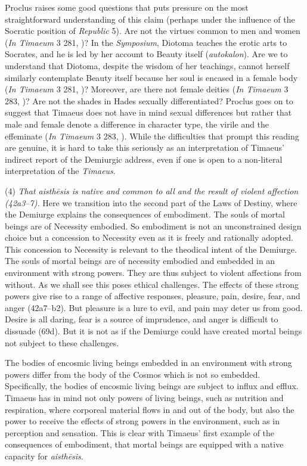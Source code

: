 Proclus raises some good questions that puts pressure on the most straightforward understanding of this claim (perhaps under the influence of the Socratic position of \emph{Republic} 5). Are not the virtues common to men and women (\emph{In Timaeum} 3 281, \citealt{Diehl:1903re})? In the \emph{Symposium}, Diotoma teaches the erotic arts to Socrates, and he is led by her account to Beauty itself (\emph{autokalon}). Are we to understand that Diotoma, despite the wisdom of her teachings, cannot herself similarly contemplate Beauty itself because her soul is encased in a female body (\emph{In Timaeum} 3 281, \citealt{Diehl:1903re})? Moreover, are there not female deities (\emph{In Timaeum} 3 283, \citealt{Diehl:1903re})? Are not the shades in Hades sexually differentiated? Proclus goes on to suggest that Timaeus does not have in mind sexual differences but rather that male and female denote a difference in character type, the virile and the effeminate (\emph{In Timaeum} 3 283, \citealt{Diehl:1903re}). While the difficulties that prompt this reading are genuine, it is hard to take this seriously as an interpretation of Timaeus' indirect report of the Demiurgic address, even if one is open to a non-literal interpretation of the \emph{Timaeus}.

(4) \emph{That \emph{aisthēsis} is native and common to all and the result of violent affection (42a3--7).} Here we transition into the second part of the Laws of Destiny, where the Demiurge explains the consequences of embodiment. The souls of mortal beings are of Necessity embodied. So embodiment is not an unconstrained design choice but a concession to Necessity even as it is freely and rationally adopted. This concession to Necessity is relevant to the theodical intent of the Demiurge. The souls of mortal beings are of necessity embodied and embedded in an environment with strong powers. They are thus subject to violent affections from without. As we shall see this poses ethical challenges. The effects of these strong powers give rise to a range of affective responses, pleasure, pain, desire, fear, and anger (42a7--b2). But pleasure is a lure to evil, and pain may deter us from good. Desire is all daring, fear is a source of imprudence, and anger is difficult to dissuade (69d). But it is not as if the Demiurge could have created mortal beings not subject to these challenges.

The bodies of encosmic living beings embedded in an environment with strong powers differ from the body of the Cosmos which is not so embedded. Specifically, the bodies of encosmic living beings are subject to influx and efflux. Timaeus has in mind not only powers of living beings, such as nutrition and respiration, where corporeal material flows in and out of the body, but also the power to receive the effects of strong powers in the environment, such as in perception and sensation. This is clear with Timaeus' first example of the consequences of embodiment, that mortal beings are equipped with a native capacity for \emph{aisthēsis}.

